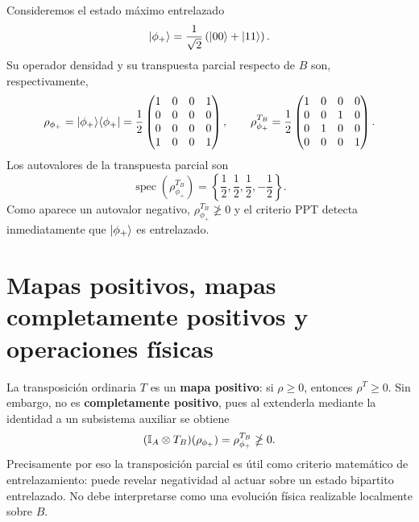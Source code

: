 \documentclass[../main.tex]{subfiles}
\begin{document}
Consideremos el estado máximo entrelazado
\begin{equation*}
    \ket{\phi_+}
    =\frac{1}{\sqrt{2}}
    \left(\ket{00}+\ket{11}\right).
\end{equation*}
Su operador densidad y su transpuesta parcial respecto de $B$ son, respectivamente,
\begin{equation*}
    \rho_{\phi_+}
    =\ket{\phi_+}\!\bra{\phi_+}
    =\frac{1}{2}
    \begin{pmatrix}
        1 & 0 & 0 & 1\\
        0 & 0 & 0 & 0\\
        0 & 0 & 0 & 0\\
        1 & 0 & 0 & 1
    \end{pmatrix},
    \qquad
    \rho_{\phi_+}^{T_B}
    =\frac{1}{2}
    \begin{pmatrix}
        1 & 0 & 0 & 0\\
        0 & 0 & 1 & 0\\
        0 & 1 & 0 & 0\\
        0 & 0 & 0 & 1
    \end{pmatrix}.
\end{equation*}
Los autovalores de la transpuesta parcial son
\begin{equation*}
    \operatorname{spec}\left(\rho_{\phi_+}^{T_B}\right)
    =\left\{\frac{1}{2},\frac{1}{2},\frac{1}{2},-\frac{1}{2}\right\}.
\end{equation*}
Como aparece un autovalor negativo, $\rho_{\phi_+}^{T_B}\ngeq 0$ y el criterio PPT detecta inmediatamente que $\ket{\phi_+}$ es entrelazado.

\section{Mapas positivos, mapas completamente positivos y operaciones físicas}

La transposición ordinaria $T$ es un \textbf{mapa positivo}: si $\rho\geq 0$, entonces $\rho^{T}\geq 0$. Sin embargo, no es \textbf{completamente positivo}, pues al extenderla mediante la identidad a un subsistema auxiliar se obtiene
\begin{equation*}
    (\mathbb{I}_A\otimes T_B)(\rho_{\phi_+})
    =\rho_{\phi_+}^{T_B}\ngeq 0.
\end{equation*}
Precisamente por eso la transposición parcial es útil como criterio matemático de entrelazamiento: puede revelar negatividad al actuar sobre un estado bipartito entrelazado. No debe interpretarse como una evolución física realizable localmente sobre $B$.
\end{document}
